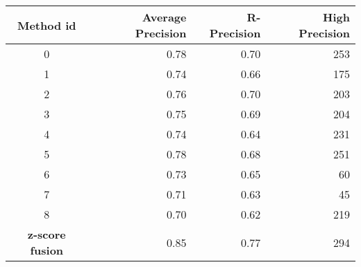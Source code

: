 \begin{table}[H]
  \label{tab:9rl_results_st_jean_A_B}
  \begin{tabular}{c r r r}
    \toprule
    Method id &
    Average Precision &
    R-Precision &
    High Precision \\
    \midrule
    0 & 0.78 & 0.70 & 253 \\
    1 & 0.74 & 0.66 & 175 \\
    2 & 0.76 & 0.70 & 203 \\
    3 & 0.75 & 0.69 & 204 \\
    4 & 0.74 & 0.64 & 231 \\
    5 & 0.78 & 0.68 & 251 \\
    6 & 0.73 & 0.65 & 60 \\
    7 & 0.71 & 0.63 & 45 \\
    8 & 0.70 & 0.62 & 219 \\
    \textbf{z-score fusion} & 0.85 & 0.77 & 294 \\
    \bottomrule
  \end{tabular}

\end{table}
